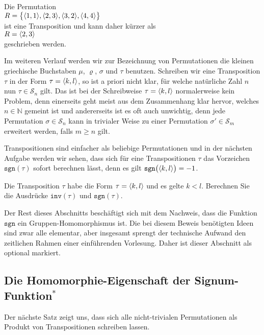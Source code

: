 \example
Die Permutation 
\\[0.2cm]
\hspace*{1.3cm}
$R = \bigl\{ \pair(1,1), \pair(2,3), \pair(3,2), \pair(4,4) \bigr\}$
\\[0.2cm]
ist eine Transposition und kann daher k\"urzer als
\\[0.2cm]
\hspace*{1.3cm}
$R = \pair(2,3)$
\\[0.2cm]
geschrieben werden. \eox

\remark
Im weiteren Verlauf werden wir zur Bezeichnung von Permutationen die kleinen griechische Buchstaben
$\mu$, $\varrho$, $\sigma$ und $\tau$ benutzen.
Schreiben wir eine Transposition $\tau$ in der Form $\tau = \pair(k,l)$, so ist a priori nicht
klar, f\"ur welche nat\"urliche Zahl $n$ nun $\tau \in \mathcal{S}_n$ gilt.  Das ist bei der
Schreibweise $\tau = \pair(k,l)$ normalerweise kein Problem, denn einerseits geht meist aus dem Zusammenhang
klar hervor, welches $n \in  \mathbb{N}$ gemeint ist und andererseits ist es oft auch 
unwichtig, denn jede Permutation $\sigma \in \mathcal{S}_n$ kann in trivialer Weise zu einer Permutation
$\sigma'\in \mathcal{S}_m$ erweitert werden, falls $m \geq n$ gilt. \eox

Transpositionen sind einfacher als beliebige Permutationen und in der n\"achsten Aufgabe werden wir
sehen, dass sich  f\"ur eine Transpositionen $\tau$ das Vorzeichen $\mathtt{sgn}(\tau)$ sofort berechnen l\"asst, denn es gilt
$\mathtt{sgn}\bigl(\pair(k,l)\bigr) = -1$.

\exercise
Die Transposition $\tau$ habe die Form  $\tau = \pair(k,l)$ 
und es gelte $k < l$.  Berechnen Sie die Ausdr\"ucke $\mathtt{inv}(\tau)$ und $\mathtt{sgn}(\tau)$.
\eox


Der Rest dieses Abschnitts besch\"aftigt sich mit dem Nachweis, dass die Funktion $\mathtt{sgn}$ ein
Gruppen-Homomorphismus ist.  Die bei diesem Beweis ben\"otigten Ideen sind zwar alle elementar, aber
insgesamt sprengt der technische Aufwand den zeitlichen Rahmen einer einf\"uhrenden Vorlesung.  Daher
ist dieser Abschnitt als optional markiert. 

\subsection{Die Homomorphie-Eigenschaft der Signum-Funktion$^*$}
Der n\"achste Satz zeigt uns, dass
sich alle nicht-trivialen Permutationen als Produkt von Transpositionen schreiben lassen.  

